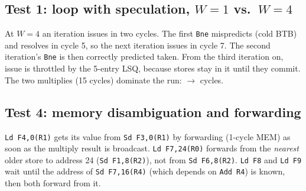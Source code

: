 \documentclass[11pt]{article}
\begin{document}
\subsection{Test 1: loop with speculation, \texorpdfstring{$W=1$ vs.\ $W=4$}{W=1 vs. W=4}}
At $W{=}4$ an iteration issues in two cycles. The first \texttt{Bne} mispredicts (cold BTB) and
resolves in cycle 5, so the next iteration issues in cycle 7. The second iteration's
\texttt{Bne} is then correctly predicted taken. From the third iteration on, issue is throttled
by the 5-entry LSQ, because stores stay in it until they commit. The two multiplies (15 cycles)
dominate the run: \tOneWone{} $\to$ \tOneWfour{} cycles.
\begin{table}[H]\centering\footnotesize

\caption{\texttt{test1} instruction status, $W{=}1$ (1 CDB).}
\end{table}
\begin{table}[H]\centering\footnotesize

\caption{\texttt{test1} instruction status, $W{=}4$ (1 CDB).}
\end{table}

\subsection{Test 4: memory disambiguation and forwarding}
\texttt{Ld F4,0(R1)} gets its value from \texttt{Sd F3,0(R1)} by forwarding (1-cycle MEM) as soon as
the multiply result is broadcast. \texttt{Ld F7,24(R0)} forwards from the \emph{nearest} older
store to address 24 (\texttt{Sd F1,8(R2)}), not from \texttt{Sd F6,8(R2)}. \texttt{Ld F8} and
\texttt{Ld F9} wait until the address of \texttt{Sd F7,16(R4)} (which depends on \texttt{Add R4}) is
known, then both forward from it.
\begin{table}[H]\centering\footnotesize

\caption{\texttt{test4} instruction status, $W{=}1$ (1 CDB).}
\end{table}
\begin{table}[H]\centering\footnotesize

\caption{\texttt{test4} instruction status, $W{=}2$ (1 CDB).}
\end{table}
\end{document}
